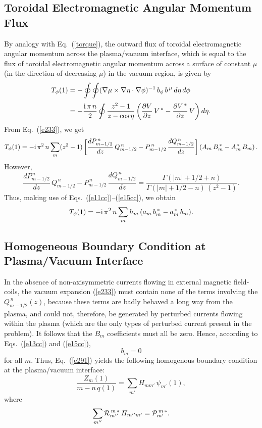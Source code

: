 \documentclass[12pt,prb,aps]{revtex4-1}
\begin{document}
\subsection{Toroidal Electromagnetic Angular Momentum Flux}
By analogy with Eq.~(\ref{torque}), the outward flux of toroidal electromagnetic angular momentum across the plasma/vacuum interface,
which is equal to the flux of  toroidal electromagnetic angular momentum across a surface of constant $\mu$ (in the direction of
decreasing $\mu$) in the vacuum region, is given by 
\begin{align}
T_\phi(1) &= -\oint\oint (\nabla\mu\times \nabla\eta\cdot\nabla\phi)^{-1}\,b_\phi\,b^{\,\mu}\,d\eta\,d\phi\nonumber\\[0.5ex]
&= -\frac{{\rm i}\,\pi\,n}{2}\oint \frac{z^2-1}{z-\cos\eta}\left(\frac{\partial V}{\partial z}\,V^{\,\ast}-\frac{\partial V^{\,\ast}}{\partial z}\,V\right)d\eta.
\end{align}
From Eq.~(\ref{e233}), we get
\begin{equation}
T_\phi(1)=-{\rm i}\,\pi^2\,n\sum_m(z^2-1)\left[\frac{dP_{m-1/2}^{\,n}}{dz}\,Q_{m-1/2}^{\,n}- P_{m-1/2}^{\,n}\,\frac{dQ_{m-1/2}^{\,n}}{dz}\right]
\left(A_m\,B_m^{\,\ast}- A_m^{\,\ast}\,B_m\right).
\end{equation}
However,\cite{morse3}
\begin{equation}
\frac{dP_{m-1/2}^{\,n}}{dz}\,Q_{m-1/2}^{\,n}- P_{m-1/2}^{\,n}\,\frac{dQ_{m-1/2}^{\,n}}{dz}= \frac{\Gamma(|m|+1/2+n)}{\Gamma(|m|+1/2-n)\,(z^2-1)}.
\end{equation}
Thus, making use of Eqs.~(\ref{e11cc})--(\ref{e15cc}), we obtain
\begin{equation}\label{e90cc}
T_\phi(1) =- {\rm i}\,\pi^2\,n\sum_m h_m\,(a_m\,b_m^{\,\ast}-a_m^{\,\ast}\,b_m).
\end{equation}

\subsection{Homogeneous Boundary Condition at Plasma/Vacuum Interface}
In the absence of non-axisymmetric currents flowing in  external magnetic field-coils, the vacuum expansion  (\ref{e233})
must contain none of the terms involving the $Q_{m-1/2}^{\,n}(z)$, because these terms are badly behaved a long way from the plasma,
and could not, therefore, be generated by perturbed currents flowing within the plasma (which are the only types of perturbed current present in the problem).  It follows that the $B_m$ coefficients must all be zero. Hence, according to
Eqs.~(\ref{e13cc}) and (\ref{e15cc}), 
\begin{equation}\label{e296}
b_m= 0
\end{equation}
for all $m$. Thus, Eq.~(\ref{e291}) yields the following homogenous boundary condition at the plasma/vacuum interface:
\begin{equation}\label{e297}
\frac{Z_{m}(1)}{m-n\,q(1)}= \sum_{m'}H_{mm'}\,\psi_{m'}(1),
\end{equation}
where
\begin{equation}\label{e298}
\sum_{m''}{\cal R}_{m''}^{\,m\,\ast}\,H_{m'' m'}= {\cal P}_{m'}^{\,m\,\ast}.
\end{equation}
\end{document}
